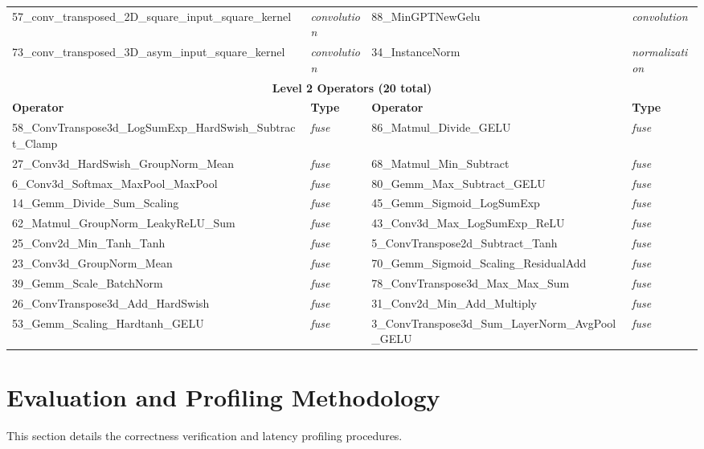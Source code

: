 \documentclass{article} %
\theoremstyle{definition}
\theoremstyle{remark}
\begin{document}
\begin{table}[h!]
\begin{tabular}{@{}ll@{\hspace{1.2em}}ll@{}}
  57\_conv\_transposed\_2D\_square\_input\_square\_kernel & \textit{convolution} & 88\_MinGPTNewGelu & \textit{convolution} \\
  73\_conv\_transposed\_3D\_asym\_input\_square\_kernel & \textit{convolution} & 34\_InstanceNorm & \textit{normalization} \\
  \midrule
  \multicolumn{4}{c}{\textbf{Level 2 Operators (20 total)}} \\
  \midrule
  \textbf{Operator} & \textbf{Type} & \textbf{Operator} & \textbf{Type} \\
  \midrule
  58\_ConvTranspose3d\_LogSumExp\_HardSwish\_Subtract\_Clamp & \textit{fuse} & 86\_Matmul\_Divide\_GELU & \textit{fuse} \\
  27\_Conv3d\_HardSwish\_GroupNorm\_Mean & \textit{fuse} & 68\_Matmul\_Min\_Subtract & \textit{fuse} \\
  6\_Conv3d\_Softmax\_MaxPool\_MaxPool & \textit{fuse} & 80\_Gemm\_Max\_Subtract\_GELU & \textit{fuse} \\
  14\_Gemm\_Divide\_Sum\_Scaling & \textit{fuse} & 45\_Gemm\_Sigmoid\_LogSumExp & \textit{fuse} \\
  62\_Matmul\_GroupNorm\_LeakyReLU\_Sum & \textit{fuse} & 43\_Conv3d\_Max\_LogSumExp\_ReLU & \textit{fuse} \\
  25\_Conv2d\_Min\_Tanh\_Tanh & \textit{fuse} & 5\_ConvTranspose2d\_Subtract\_Tanh & \textit{fuse} \\
  23\_Conv3d\_GroupNorm\_Mean & \textit{fuse} & 70\_Gemm\_Sigmoid\_Scaling\_ResidualAdd & \textit{fuse} \\
  39\_Gemm\_Scale\_BatchNorm & \textit{fuse} & 78\_ConvTranspose3d\_Max\_Max\_Sum & \textit{fuse} \\
  26\_ConvTranspose3d\_Add\_HardSwish & \textit{fuse} & 31\_Conv2d\_Min\_Add\_Multiply & \textit{fuse} \\
  53\_Gemm\_Scaling\_Hardtanh\_GELU & \textit{fuse} & 3\_ConvTranspose3d\_Sum\_LayerNorm\_AvgPool\_GELU & \textit{fuse} \\
  \bottomrule
  \end{tabular}
  \end{table}
  
  \section{Evaluation and Profiling Methodology}
  \label{app:eval_methodology}

  This section details the correctness verification and latency profiling procedures.
\end{document}
